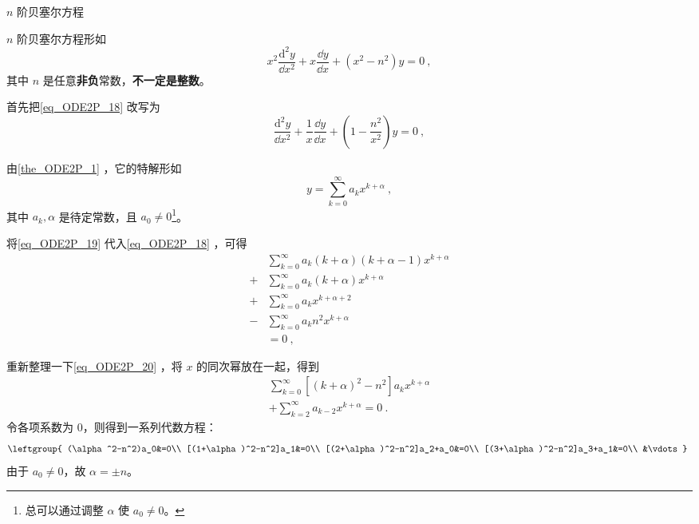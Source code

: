 \begin{example}{$n$ 阶贝塞尔方程}\label{ex_ODE2P_4}

$n$ 阶贝塞尔方程形如
\begin{equation}\label{eq_ODE2P_18}
x^2\frac{\mathrm{d}^2 y}{\dd x^2}+x\frac{\dd y}{\dd x}+(x^2-n^2)y=0~,
\end{equation}
其中 $n$ 是任意\textbf{非负}常数，\textbf{不一定是整数}。

首先把\autoref{eq_ODE2P_18} 改写为
\begin{equation}
\frac{\mathrm{d}^2 y}{\dd x^2}+\frac{1}{x}\frac{\dd y}{\dd x}+(1-\frac{n^2}{x^2})y=0~,
\end{equation}

由\autoref{the_ODE2P_1} ，它的特解形如
\begin{equation}\label{eq_ODE2P_19}
y=\sum\limits_{k=0}^\infty a_kx^{k+\alpha}~,
\end{equation}
其中 $a_k, \alpha$ 是待定常数，且 $a_0\neq 0$\footnote{总可以通过调整 $\alpha$ 使 $a_0\neq 0$。}。

将\autoref{eq_ODE2P_19} 代入\autoref{eq_ODE2P_18} ，可得
\begin{equation}\label{eq_ODE2P_20}
\begin{aligned}
&\sum\limits^\infty_{k=0}a_k(k+\alpha)(k+\alpha-1)x^{k+\alpha}\\+
&\sum\limits^\infty_{k=0}a_k(k+\alpha)x^{k+\alpha}\\+
&\sum\limits^\infty_{k=0}a_kx^{k+\alpha+2}\\-
&\sum\limits^\infty_{k=0}a_kn^2x^{k+\alpha}\\
&=0~,
\end{aligned}
\end{equation}

重新整理一下\autoref{eq_ODE2P_20} ，将 $x$ 的同次幂放在一起，得到
\begin{equation}
\begin{aligned}
\sum\limits^\infty_{k=0}[(k+\alpha)^2-n^2]a_kx^{k+\alpha}\\
+\sum\limits^\infty_{k=2}a_{k-2}x^{k+\alpha}=0~.
\end{aligned}
\end{equation}
令各项系数为 $0$，则得到一系列代数方程：
\begin{equation}\label{eq_ODE2P_21}
\leftgroup{
    (\alpha^2-n^2)a_0&=0\\
    [(1+\alpha)^2-n^2]a_1&=0\\
    [(2+\alpha)^2-n^2]a_2+a_0&=0\\
    [(3+\alpha)^2-n^2]a_3+a_1&=0\\
    &\vdots
}~
\end{equation}
由于 $a_0\neq 0$，故 $\alpha=\pm n$。


\end{example}
